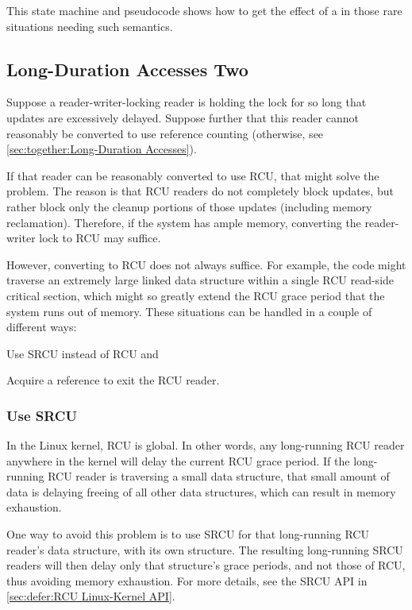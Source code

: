 This state machine and pseudocode shows how to get the effect of a
 in those rare situations needing such semantics.

\subsection{Long-Duration Accesses Two}
\label{sec:together:Long-Duration Accesses Two}

Suppose a reader-writer-locking reader is holding the lock for so
long that updates are excessively delayed.
Suppose further that this reader cannot reasonably be converted to
use reference counting
(otherwise, see \cref{sec:together:Long-Duration Accesses}).

If that reader can be reasonably converted to use RCU, that might
solve the problem.
The reason is that RCU readers do not completely block updates, but
rather block only the cleanup portions of those updates (including
memory reclamation).
Therefore, if the system has ample memory, converting the reader-writer
lock to RCU may suffice.

However, converting to RCU does not always suffice.
For example, the code might traverse an extremely large linked data
structure within a single RCU read-side critical section, which might
so greatly extend the RCU grace period that the system runs out of memory.
These situations can be handled in a couple of different ways:
\begin{enumerate*}[(1)]
\item	Use SRCU instead of RCU and
\item	Acquire a reference to exit the RCU reader.
\end{enumerate*}

\subsubsection{Use SRCU}
\label{sec:together:Use SRCU}

In the Linux kernel, RCU is global.
In other words, any long-running RCU reader anywhere in the kernel will
delay the current RCU grace period.
If the long-running RCU reader is traversing a small data structure,
that small amount of data is delaying freeing of all other data structures,
which can result in memory exhaustion.

One way to avoid this problem is to use SRCU for that long-running RCU
reader's data structure, with its own  structure.
The resulting long-running SRCU readers will then delay only that
 structure's grace periods, and not those of RCU,
thus avoiding memory exhaustion.
For more details, see the SRCU API in \cref{sec:defer:RCU Linux-Kernel API}.

